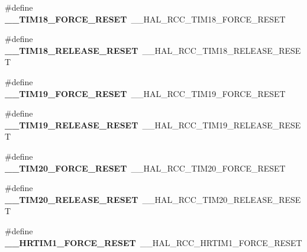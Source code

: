 \begin{DoxyCompactItemize}
\item 
\hypertarget{group___h_a_l___r_c_c___aliased_ga6b03e584a99a7145ffd9953327722870}{\#define {\bfseries \-\_\-\-\_\-\-T\-I\-M18\-\_\-\-F\-O\-R\-C\-E\-\_\-\-R\-E\-S\-E\-T}~\-\_\-\-\_\-\-H\-A\-L\-\_\-\-R\-C\-C\-\_\-\-T\-I\-M18\-\_\-\-F\-O\-R\-C\-E\-\_\-\-R\-E\-S\-E\-T}\label{group___h_a_l___r_c_c___aliased_ga6b03e584a99a7145ffd9953327722870}

\item 
\hypertarget{group___h_a_l___r_c_c___aliased_ga062debe81b59ed9a88bcf4258e09dbaf}{\#define {\bfseries \-\_\-\-\_\-\-T\-I\-M18\-\_\-\-R\-E\-L\-E\-A\-S\-E\-\_\-\-R\-E\-S\-E\-T}~\-\_\-\-\_\-\-H\-A\-L\-\_\-\-R\-C\-C\-\_\-\-T\-I\-M18\-\_\-\-R\-E\-L\-E\-A\-S\-E\-\_\-\-R\-E\-S\-E\-T}\label{group___h_a_l___r_c_c___aliased_ga062debe81b59ed9a88bcf4258e09dbaf}

\item 
\hypertarget{group___h_a_l___r_c_c___aliased_ga9e4eca7dac56bd682758cf5072f4e063}{\#define {\bfseries \-\_\-\-\_\-\-T\-I\-M19\-\_\-\-F\-O\-R\-C\-E\-\_\-\-R\-E\-S\-E\-T}~\-\_\-\-\_\-\-H\-A\-L\-\_\-\-R\-C\-C\-\_\-\-T\-I\-M19\-\_\-\-F\-O\-R\-C\-E\-\_\-\-R\-E\-S\-E\-T}\label{group___h_a_l___r_c_c___aliased_ga9e4eca7dac56bd682758cf5072f4e063}

\item 
\hypertarget{group___h_a_l___r_c_c___aliased_ga16341f8a1420c4029215b0c89de8bda5}{\#define {\bfseries \-\_\-\-\_\-\-T\-I\-M19\-\_\-\-R\-E\-L\-E\-A\-S\-E\-\_\-\-R\-E\-S\-E\-T}~\-\_\-\-\_\-\-H\-A\-L\-\_\-\-R\-C\-C\-\_\-\-T\-I\-M19\-\_\-\-R\-E\-L\-E\-A\-S\-E\-\_\-\-R\-E\-S\-E\-T}\label{group___h_a_l___r_c_c___aliased_ga16341f8a1420c4029215b0c89de8bda5}

\item 
\hypertarget{group___h_a_l___r_c_c___aliased_gab06074cd313cdabefa42d60b6480abc1}{\#define {\bfseries \-\_\-\-\_\-\-T\-I\-M20\-\_\-\-F\-O\-R\-C\-E\-\_\-\-R\-E\-S\-E\-T}~\-\_\-\-\_\-\-H\-A\-L\-\_\-\-R\-C\-C\-\_\-\-T\-I\-M20\-\_\-\-F\-O\-R\-C\-E\-\_\-\-R\-E\-S\-E\-T}\label{group___h_a_l___r_c_c___aliased_gab06074cd313cdabefa42d60b6480abc1}

\item 
\hypertarget{group___h_a_l___r_c_c___aliased_gabc15a945f5f92e4dff05caf959715131}{\#define {\bfseries \-\_\-\-\_\-\-T\-I\-M20\-\_\-\-R\-E\-L\-E\-A\-S\-E\-\_\-\-R\-E\-S\-E\-T}~\-\_\-\-\_\-\-H\-A\-L\-\_\-\-R\-C\-C\-\_\-\-T\-I\-M20\-\_\-\-R\-E\-L\-E\-A\-S\-E\-\_\-\-R\-E\-S\-E\-T}\label{group___h_a_l___r_c_c___aliased_gabc15a945f5f92e4dff05caf959715131}

\item 
\hypertarget{group___h_a_l___r_c_c___aliased_ga0ae3e0425993ce111901795d509024d6}{\#define {\bfseries \-\_\-\-\_\-\-H\-R\-T\-I\-M1\-\_\-\-F\-O\-R\-C\-E\-\_\-\-R\-E\-S\-E\-T}~\-\_\-\-\_\-\-H\-A\-L\-\_\-\-R\-C\-C\-\_\-\-H\-R\-T\-I\-M1\-\_\-\-F\-O\-R\-C\-E\-\_\-\-R\-E\-S\-E\-T}\label{group___h_a_l___r_c_c___aliased_ga0ae3e0425993ce111901795d509024d6}


\end{DoxyCompactItemize}
